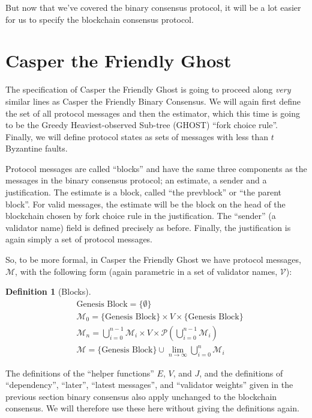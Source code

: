\documentclass{article}
\theoremstyle{definition}
\newtheorem{defn}{Definition}[section]
\begin{document}
But now that we've covered the binary consensus protocol, it will be a lot easier for us to specify the blockchain consensus protocol.


\section{Casper the Friendly Ghost}

The specification of Casper the Friendly Ghost is going to proceed along \emph{very} similar lines as Casper the Friendly Binary Consensus. We will again first define the set of all protocol messages and then the estimator, which this time is going to be the Greedy Heaviest-observed Sub-tree (GHOST) ``fork choice rule''. Finally, we will define protocol states as sets of messages with less than $t$ Byzantine faults.

Protocol messages are called ``blocks'' and have the same three components as the messages in the binary consensus protocol; an estimate, a sender and a justification. The estimate is a block, called ``the prevblock'' or ``the parent block''. For valid messages, the estimate will be the block on the head of the blockchain chosen by fork choice rule in the justification. The ``sender'' (a validator name) field is defined precisely as before. Finally, the justification is again simply a set of protocol messages.

So, to be more formal, in Casper the Friendly Ghost we have protocol messages, $\mathcal{M}$, with the following form (again parametric in a set of validator names, $\mathcal{V}$): 


\begin{defn}[Blocks]
\begin{equation*}
\begin{split}
  &\text{Genesis Block} = \{\emptyset\}\\
    &\mathcal{M}_0 = \{\text{Genesis Block}\} \times V \times \{\text{Genesis Block}\}\\
    &\mathcal{M}_n = \bigcup_{i=0}^{n-1} \mathcal{M}_i \times V \times \mathcal{P}(\bigcup_{i=0}^{n-1} \mathcal{M}_i)\\
    &\mathcal{M} = \{\text{Genesis Block}\} \cup \lim_{n \to \infty} \bigcup_{i=0}^{n} \mathcal{M}_i
\end{split}
\end{equation*}
\end{defn}

The definitions of the ``helper functions'' $E$, $V$, and $J$, and the definitions of ``dependency'', ``later'', ``latest messages'', and ``validator weights'' given in the previous section binary consensus also apply unchanged to the blockchain consensus. We will therefore use these here without giving the definitions again. 
\end{document}
